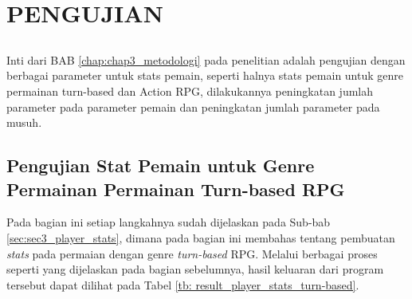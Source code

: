 \chapter{PENGUJIAN}
\label{sec:chap4_pengujian}
\vspace{1ex}

\section*{}
Inti dari BAB \ref{chap:chap3_metodologi} pada penelitian adalah pengujian dengan berbagai parameter untuk stats pemain, seperti halnya stats pemain untuk genre permainan turn-based dan Action RPG, dilakukannya peningkatan jumlah parameter pada parameter pemain dan peningkatan jumlah parameter pada musuh.
\vspace{1ex}

\section{Pengujian Stat Pemain untuk Genre Permainan Permainan Turn-based RPG}
\label{sec:sec4_pengujian_turn-based}
\vspace{1ex}

Pada bagian ini setiap langkahnya sudah dijelaskan pada Sub-bab \ref{sec:sec3_player_stats}, dimana pada bagian ini membahas tentang pembuatan \textit{stats} pada permaian dengan genre \textit{turn-based} RPG. Melalui berbagai proses seperti yang dijelaskan pada bagian sebelumnya, hasil keluaran dari program tersebut dapat dilihat pada Tabel \ref{tb: result_player_stats_turn-based}.
\vspace{1ex}

